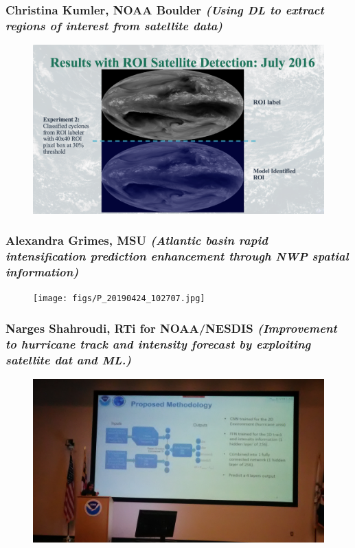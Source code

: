 \documentclass{beamer}
\begin{document}
\begin{frame}
\frametitle{Christina Kumler, NOAA Boulder \textit{(Using DL to extract regions of interest from satellite data)}}
\begin{figure}
	\includegraphics[width=.9\linewidth]{figs/ScreenShot_ROI.png}
\end{figure}
\end{frame}

\begin{frame}
\frametitle{Alexandra Grimes, MSU \textit{(Atlantic basin rapid intensification prediction enhancement through NWP spatial information)}}
\begin{figure}
	\texttt{[image: figs/P\_20190424\_102707.jpg]}
\end{figure}
\end{frame}

\begin{frame}
\frametitle{Narges Shahroudi, RTi for NOAA/NESDIS \textit{(Improvement to hurricane track and intensity forecast by exploiting satellite dat and ML.)}}
\begin{figure}
	\includegraphics[width=.9\linewidth]{figs/P_20190424_143519.jpg}
\end{figure}
\end{frame}
\end{document}
